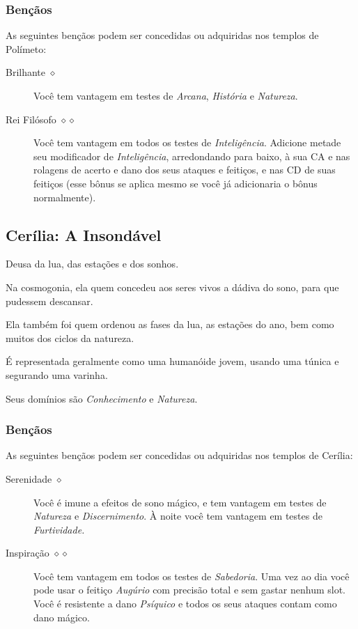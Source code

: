 \documentclass[letterpaper,twocolumn,openany]{dndbook}
\begin{document}
	\subsubsection{Bençãos}
	As seguintes bençãos podem ser concedidas ou adquiridas nos templos de Polímeto:
	\begin{description}
		\item[Brilhante $\diamond$]
		Você tem vantagem em testes de \textit{Arcana}, \textit{História} e \textit{Natureza}.
		\item[Rei Filósofo $\diamond\diamond$]
		Você tem vantagem em todos os testes de \textit{Inteligência}.
		Adicione metade seu modificador de \textit{Inteligência}, arredondando para baixo, à sua CA e nas rolagens de acerto e dano dos seus ataques e feitiços, e nas CD de suas feitiços (esse bônus se aplica mesmo se você já adicionaria o bônus normalmente).
	\end{description}
	
	\subsection{Cerília: A Insondável}
	Deusa da lua, das estações e dos sonhos.
	\par Na cosmogonia, ela quem concedeu aos seres vivos a dádiva do sono, para que pudessem descansar.
	\par Ela também foi quem ordenou as fases da lua, as estações do ano, bem como muitos dos ciclos da natureza.
	\par É representada geralmente como uma humanóide jovem, usando uma túnica e segurando uma varinha.
	\par Seus domínios são \textit{Conhecimento} e \textit{Natureza}.
	\subsubsection{Bençãos}
	As seguintes bençãos podem ser concedidas ou adquiridas nos templos de Cerília:
	\begin{description}
		\item[Serenidade $\diamond$]
		Você é imune a efeitos de sono mágico, e tem vantagem em testes de \textit{Natureza} e \textit{Discernimento}.
		À noite você tem vantagem em testes de \textit{Furtividade.}
		\item[Inspiração $\diamond\diamond$]
		Você tem vantagem em todos os testes de \textit{Sabedoria}.
		Uma vez ao dia você pode usar o feitiço \textit{Augúrio} com precisão total e sem gastar nenhum slot.
		Você é resistente a dano \textit{Psíquico} e todos os seus ataques contam como dano mágico.
	\end{description}
	
\end{document}
